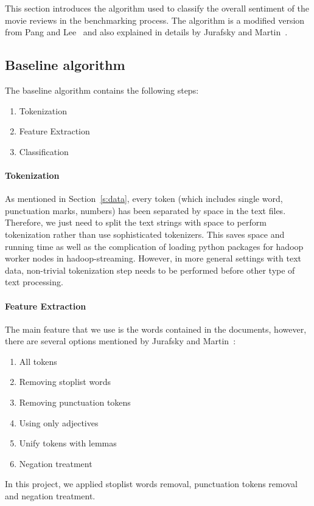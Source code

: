 This section introduces the algorithm used to classify the overall sentiment 
of the movie reviews in the benchmarking process. The algorithm is a 
modified version from Pang and 
Lee~\cite{hid-sp18-405-sentiment-pang2004asentimental} and also 
explained in details by Jurafsky and 
Martin~\cite{hid-sp18-405-sentiment-jurafsky2009}. 

\subsection{Baseline algorithm}

The baseline algorithm contains the following steps:

\begin{enumerate}
	\item Tokenization
	\item Feature Extraction
	\item Classification
\end{enumerate}

\paragraph{Tokenization}
As mentioned in Section~\ref{s:data}, every token (which includes 
single word, punctuation marks, numbers) has been separated by space in 
the text files. Therefore, we just need to split the text strings with space to 
perform tokenization rather than use sophisticated tokenizers. This saves 
space and running time as well as the complication of loading  python 
packages for hadoop worker nodes in hadoop-streaming. However, in more 
general settings with text data, non-trivial tokenization step needs to be 
performed before other type of text processing.

\paragraph{Feature Extraction}
The main feature that we use is the words contained in the documents, 
however, there are several options mentioned by Jurafsky and 
Martin~\cite{hid-sp18-405-sentiment-jurafsky2009}: 
\begin{enumerate}
	\item All tokens
	\item Removing stoplist words
	\item Removing punctuation tokens
	\item Using only adjectives
	\item Unify tokens with lemmas
	\item Negation treatment
\end{enumerate}
In this project, we applied stoplist words removal, punctuation tokens 
removal and negation treatment. 

